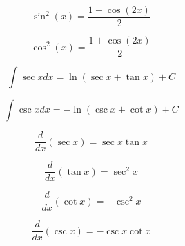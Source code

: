 \documentclass[a4paper,9pt]{scrartcl}
\begin{document}
    \begin{displaymath}
        \sin^2(x) = \frac{1-\cos(2x)}{2}
    \end{displaymath}

    \begin{displaymath}
        \cos^2(x) = \frac{1+\cos(2x)}{2}
    \end{displaymath}

    \begin{displaymath}
        \int{\sec{x}}dx = \ln{(\sec{x} + \tan{x})} + C
    \end{displaymath}

    \begin{displaymath}
        \int{\csc{x}}dx = -\ln({\csc{x} + \cot{x}}) + C
    \end{displaymath}

    \begin{displaymath}
        \frac{d}{dx}(\sec{x}) = \sec{x}\tan{x}
    \end{displaymath}

    \begin{displaymath}
        \frac{d}{dx}(\tan{x}) = \sec^2{x}
    \end{displaymath}

    \begin{displaymath}
        \frac{d}{dx}(\cot{x}) = -\csc^2{x}
    \end{displaymath}

    \begin{displaymath}
        \frac{d}{dx}(\csc{x}) = -\csc{x}\cot{x}
    \end{displaymath}
\end{document}

